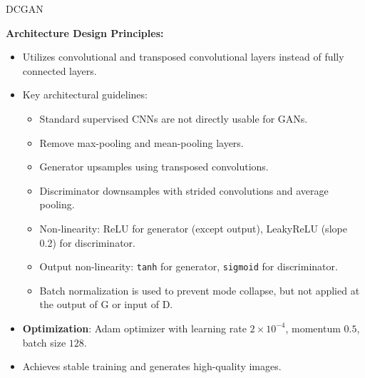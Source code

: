 \begin{frame}[allowframebreaks]{DCGAN}
    \framebreak

    \textbf{Architecture Design Principles:}
    \begin{itemize}
        \item Utilizes convolutional and transposed convolutional layers instead of fully connected layers.
        \item Key architectural guidelines:
            \begin{itemize}
                \item Standard supervised CNNs are not directly usable for GANs.
                \item Remove max-pooling and mean-pooling layers.
                \item Generator upsamples using transposed convolutions.
                \item Discriminator downsamples with strided convolutions and average pooling.
                \item Non-linearity: ReLU for generator (except output), LeakyReLU (slope 0.2) for discriminator.
                \item Output non-linearity: \texttt{tanh} for generator, \texttt{sigmoid} for discriminator.
                \item Batch normalization is used to prevent mode collapse, but not applied at the output of G or input of D.
            \end{itemize}
        \item \textbf{Optimization}: Adam optimizer with learning rate $2 \times 10^{-4}$, momentum $0.5$, batch size $128$.
        \item Achieves stable training and generates high-quality images.
    \end{itemize}
\end{frame}
    
